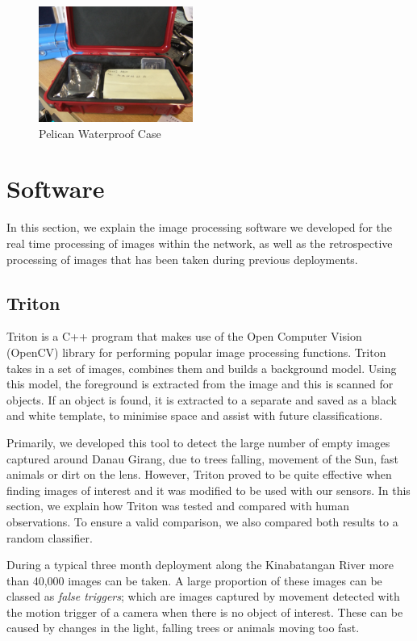 			\begin{figure}[h]
			\centering
			\includegraphics[width=0.45\textwidth]{Chap3/figures/pelican}
			\caption{Pelican Waterproof Case}
			\label{fig:tech:pelican}
			\end{figure}

\section{Software}\label{tech:sw}
	In this section, we explain the image processing software we developed for the real time processing of images within the network, as well as the retrospective processing of images that has been taken during previous deployments.

	\subsection{Triton} \label{tech:sf:triton}
		Triton is a C++ program that makes use of the Open Computer Vision (OpenCV) library for performing popular image processing functions. Triton takes in a set of images, combines them and builds a background model. Using this model, the foreground is extracted from the image and this is scanned for objects. If an object is found, it is extracted to a separate and saved as a black and white template, to minimise space and assist with future classifications.
		
		Primarily, we developed this tool to detect the large number of empty images captured around Danau Girang, due to trees falling, movement of the Sun, fast animals or dirt on the lens. However, Triton proved to be quite effective when finding images of interest and it was modified to be used with our sensors. In this section, we explain how Triton was tested and compared with human observations. To ensure a valid comparison, we also compared both results to a random classifier.
	
		During a typical three month deployment along the Kinabatangan River more than 40,000 images can be taken. A large proportion of these images can be classed as \textit{false triggers}; which are images captured by movement detected with the motion trigger of a camera when there is no object of interest. These can be caused by changes in the light, falling trees or animals moving too fast.
		
